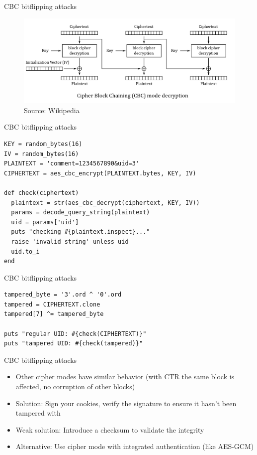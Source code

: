 \documentclass[presentation]{beamer}
\begin{document}
\begin{frame}[label={sec:org5690736}]{CBC bitflipping attacks}
\begin{figure}[htbp]
\centering
\includegraphics[width=.9\linewidth]{./img/cbc_decryption.png}
\caption{Source: Wikipedia}
\end{figure}
\end{frame}

\begin{frame}[fragile,label={sec:org55fb40f}]{CBC bitflipping attacks}
 \begin{verbatim}
KEY = random_bytes(16)
IV = random_bytes(16)
PLAINTEXT = 'comment=1234567890&uid=3'
CIPHERTEXT = aes_cbc_encrypt(PLAINTEXT.bytes, KEY, IV)

def check(ciphertext)
  plaintext = str(aes_cbc_decrypt(ciphertext, KEY, IV))
  params = decode_query_string(plaintext)
  uid = params['uid']
  puts "checking #{plaintext.inspect}..."
  raise 'invalid string' unless uid
  uid.to_i
end
\end{verbatim}
\end{frame}

\begin{frame}[fragile,label={sec:org0980ee0}]{CBC bitflipping attacks}
 \begin{verbatim}
tampered_byte = '3'.ord ^ '0'.ord
tampered = CIPHERTEXT.clone
tampered[7] ^= tampered_byte

puts "regular UID: #{check(CIPHERTEXT)}"
puts "tampered UID: #{check(tampered)}"
\end{verbatim}
\end{frame}

\begin{frame}[label={sec:orgb652c3a}]{CBC bitflipping attacks}
\begin{itemize}
\item Other cipher modes have similar behavior (with CTR the same block is
affected, no corruption of other blocks)
\item Solution: Sign your cookies, verify the signature to ensure it
hasn't been tampered with
\item Weak solution: Introduce a checksum to validate the integrity
\item Alternative: Use cipher mode with integrated authentication (like
AES-GCM)
\end{itemize}
\end{frame}
\end{document}
